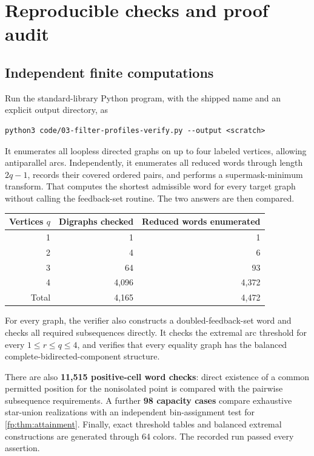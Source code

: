 \documentclass[11pt,letterpaper]{article}
\numberwithin{equation}{section}
\theoremstyle{definition}
\theoremstyle{remark}
\theoremstyle{definition}
\begin{document}
\section{Reproducible checks and proof audit}
\label{fp:sec:verification}

\subsection{Independent finite computations}

Run the standard-library Python program, with the shipped name and an
explicit output directory, as
\begin{lstlisting}
python3 code/03-filter-profiles-verify.py --output <scratch>
\end{lstlisting}
It enumerates all loopless directed graphs on up to four labeled vertices,
allowing antiparallel arcs. Independently, it enumerates all reduced words
through length \(2q-1\), records their covered ordered pairs, and performs
a supermask-minimum transform. That computes the shortest admissible word
for every target graph without calling the feedback-set routine. The two
answers are then compared.

\begin{center}
\begin{tabular}{@{}rrr@{}}
\toprule
Vertices \(q\)&Digraphs checked&Reduced words enumerated\\
\midrule
1&1&1\\
2&4&6\\
3&64&93\\
4&4,096&4,372\\
\midrule
Total&4,165&4,472\\
\bottomrule
\end{tabular}
\end{center}

For every graph, the verifier also constructs a doubled-feedback-set word
and checks all required subsequences directly. It checks the extremal arc
threshold for every \(1\leq r\leq q\leq4\), and verifies that every
equality graph has the balanced complete-bidirected-component structure.

There are also \textbf{11,515 positive-cell word checks}: direct existence
of a common permitted position for the nonisolated point is compared with
the pairwise subsequence requirements. A further \textbf{98 capacity
cases} compare exhaustive star-union realizations with an independent
bin-assignment test for \cref{fp:thm:attainment}. Finally, exact threshold
tables and balanced extremal constructions are generated through 64 colors.
The recorded run passed every assertion.
\end{document}
